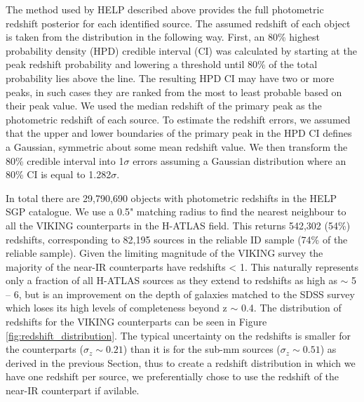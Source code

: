 The method used by HELP described above provides the full photometric redshift posterior for each identified source. The assumed redshift of each object is taken from the distribution in the following way. First, an 80\% highest probability density (HPD) credible interval (CI) was calculated by starting at the peak redshift probability and lowering a threshold until 80\% of the total probability lies above the line. The resulting HPD CI may have two or more peaks, in such cases they are ranked from the most to least probable based on their peak value. We used the median redshift of the primary peak as the photometric redshift of each source. To estimate the redshift errors, we assumed that the upper and lower boundaries of the primary peak in the HPD CI defines a Gaussian, symmetric about some mean redshift value. We then transform the 80\% credible interval into 1$\sigma$ errors assuming a Gaussian distribution where an 80\% CI is equal to 1.282$\sigma$.

In total there are 29,790,690 objects with photometric redshifts in the HELP SGP catalogue. We use a 0.5" matching radius to find the nearest neighbour to all the VIKING counterparts in the H-ATLAS field. This returns 542,302 (54\%) redshifts, corresponding to 82,195 sources in the reliable ID sample (74\% of the reliable sample). Given the limiting magnitude of the VIKING survey the majority of the near-IR counterparts have redshifts < 1. This naturally represents only a fraction of all H-ATLAS sources as they extend to redshifts as high as $\sim$ 5 -- 6, but is an improvement on the depth of galaxies matched to the SDSS survey which loses its high levels of completeness beyond z $\sim$ 0.4. The distribution of redshifts for the VIKING counterparts can be seen in Figure \ref{fig:redshift_distribution}. The typical uncertainty on the redshifts is smaller for the counterparts ($\sigma_z \sim 0.21$) than it is for the sub-mm sources ($\sigma_z \sim 0.51$) as derived in the previous Section, thus to create a redshift distribution in which we have one redshift per source, we preferentially chose to use the redshift of the near-IR counterpart if avilable.

